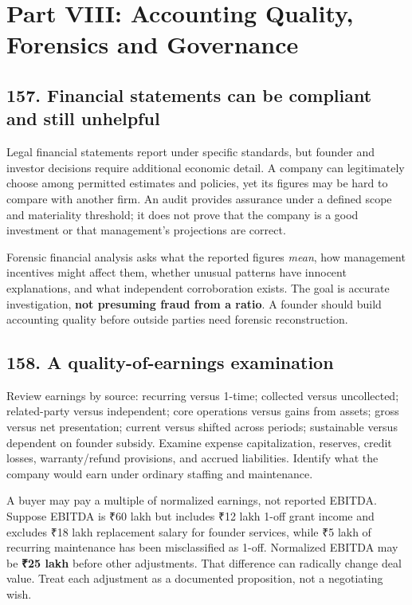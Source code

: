 \section{Part VIII: Accounting Quality, Forensics and Governance}

\subsection{157. Financial statements can be compliant and still unhelpful}


Legal financial statements report under specific standards, but founder and investor decisions require additional economic detail. A company can legitimately choose among permitted estimates and policies, yet its figures may be hard to compare with another firm. An audit provides assurance under a defined scope and materiality threshold; it does not prove that the company is a good investment or that management's projections are correct.

Forensic financial analysis asks what the reported figures \textit{mean}, how management incentives might affect them, whether unusual patterns have innocent explanations, and what independent corroboration exists. The goal is accurate investigation, \textbf{not presuming fraud from a ratio}. A founder should build accounting quality before outside parties need forensic reconstruction.

\subsection{158. A quality-of-earnings examination}


Review earnings by source: recurring versus 1-time; collected versus uncollected; related-party versus independent; core operations versus gains from assets; gross versus net presentation; current versus shifted across periods; sustainable versus dependent on founder subsidy. Examine expense capitalization, reserves, credit losses, warranty/refund provisions, and accrued liabilities. Identify what the company would earn under ordinary staffing and maintenance.

A buyer may pay a multiple of normalized earnings, not reported EBITDA. Suppose EBITDA is ₹60 lakh but includes ₹12 lakh 1-off grant income and excludes ₹18 lakh replacement salary for founder services, while ₹5 lakh of recurring maintenance has been misclassified as 1-off. Normalized EBITDA may be \textbf{₹25 lakh} before other adjustments. That difference can radically change deal value. Treat each adjustment as a documented proposition, not a negotiating wish.

